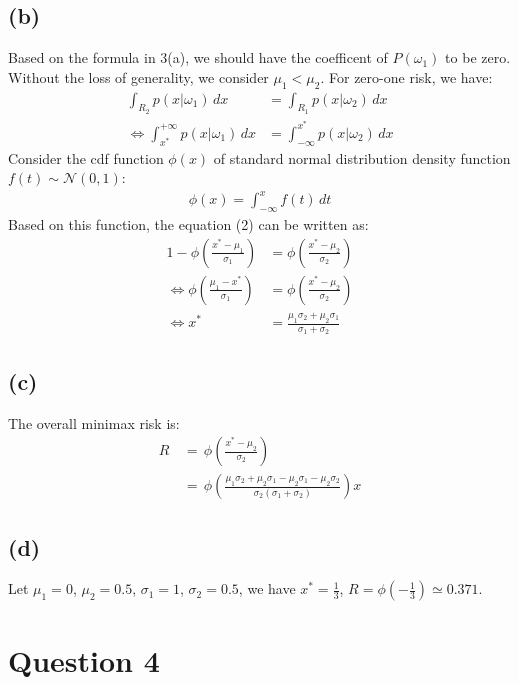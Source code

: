 \documentclass{article}
\newcommand{\question}[1]{\section*{Question #1}}
\renewcommand{\part}[1]{\subsection*{(#1)}}
\begin{document}
\part{b}
Based on the formula in 3(a), we should have the coefficent of $P(\omega_1)$ to be zero. Without the loss of generality, we consider $\mu_1 < \mu_2$. For zero-one risk, we have:
\begin{align}
    \int_{R_2}p(x|\omega_1) \, dx &= \int_{R_1}p(x|\omega_2) \, dx \\
    \Leftrightarrow \int^{+\infty}_{x^*} p(x|\omega_1) \,dx &= \int^{x^*}_{-\infty}p(x|\omega_2) \, dx
\end{align}
Consider the cdf function $\phi(x)$ of standard normal distribution density function $f(t) \sim \mathcal N(0, 1)$:
\begin{align}
  \phi(x) = \int^x_{-\infty} f(t) \, dt
\end{align}
Based on this function, the equation (2) can be written as:
\begin{align}
  1 - \phi(\frac{x^* - \mu_1}{\sigma_1}) &= \phi(\frac{x^* - \mu_2}{\sigma_2}) \\
  \Leftrightarrow \phi(\frac{\mu_1 - x^*}{\sigma_1}) &= \phi(\frac{x^* - \mu_2}{\sigma_2}) \\
  \Leftrightarrow x^* &= \frac{\mu_1 \sigma_2 + \mu_2 \sigma_1}{\sigma_1 + \sigma_2}
\end{align}

\part{c}
The overall minimax risk is:
\begin{align*}
  R \,&= \, \phi(\frac{x^* - \mu_2}{\sigma_2}) \\
    &=\, \phi(\frac{\mu_1\sigma_2 + \mu_2\sigma_1 - \mu_2\sigma_1 - \mu_2\sigma_2}{\sigma_2(\sigma_1 + \sigma_2)})x
\end{align*}

\part{d}
Let $\mu_1 = 0$, $\mu_2 = 0.5$, $\sigma_1 = 1$, $\sigma_2 = 0.5$, we have $x^* = \frac{1}{3}$, $R = \phi(-\frac{1}{3}) \simeq 0.371$.

\question{4}
\end{document}
